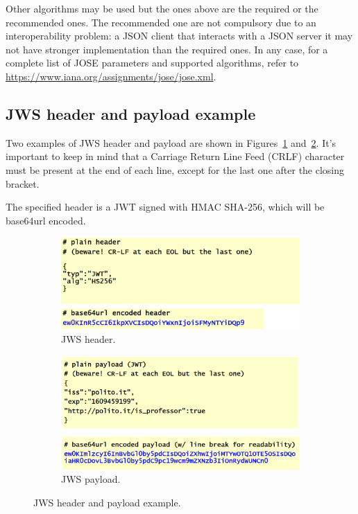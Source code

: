 Other algorithms may be used but the ones above are the required or
the recommended ones. The recommended one are not compulsory due to an
interoperability problem: a JSON client that interacts with a JSON
server it may not have stronger implementation than the required ones.
In any case, for a complete list of JOSE parameters and supported
algorithms, refer to
\url{https://www.iana.org/assignments/jose/jose.xml}.

\subsection{JWS header and payload example}
Two examples of JWS header and payload are shown in 
Figures~\ref{fig:jws header} and~\ref{fig:jws payload}.
It's important to keep in mind that a Carriage Return Line Feed (CRLF) 
character must be present at the end of each line, except for the
last one after the closing bracket. 

The specified header is a JWT signed with HMAC SHA-256, which will be
base64url encoded.

\begin{figure}[H]
  \centering
  \begin{subfigure}[b]{0.49\textwidth}
    \includegraphics[width=\textwidth]{img/jws header ex.png}
    \caption{JWS header.}
    \label{fig:jws header}
  \end{subfigure}
  \begin{subfigure}[b]{0.49\textwidth}
    \includegraphics[width=\textwidth]{img/jws payload ex.png}
    \caption{JWS payload.}
    \label{fig:jws payload}
  \end{subfigure}
  \caption{JWS header and payload example.}
  \label{fig:jws header and payload}
\end{figure}

